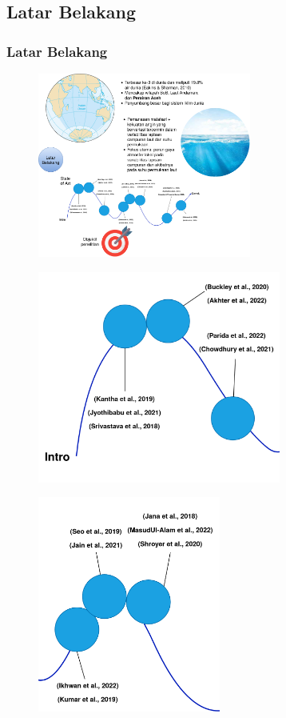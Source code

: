 \documentclass{beamer}
\begin{document}
\subsection{Latar Belakang}
\begin{frame}[allowframebreaks]
\frametitle{Latar Belakang}
	\begin{figure}[H]
		\centering
		\includegraphics[width=7cm]{intro-0}
	\end{figure}
	\begin{figure}[H]
		\centering
		\includegraphics[width=8cm]{intro-1}
	\end{figure}
	\begin{figure}[H]
		\centering
		\includegraphics[width=6cm]{intro-2}

\end{figure}
\end{frame}
\end{document}
